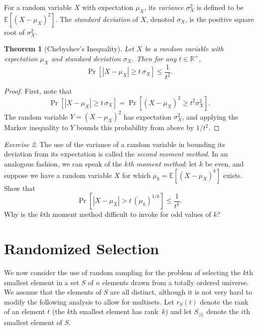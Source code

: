 \documentclass[twoside,12pt]{book}
\theoremstyle{plain}
\newtheorem{theorem}{Theorem}[chapter]
\theoremstyle{definition}
\theoremstyle{remark}
\newtheorem{exercise}[theorem]{Exercise}
\begin{document}
For a random variable $X$ with expectation $\mu_X$, its \emph{variance} $\sigma_X^2$ is defined to be $\mathbb{E}[(X - \mu_X)^2]$. The \emph{standard deviation} of $X$, denoted $\sigma_X$, is the positive square root of $\sigma_X^2$.

\begin{theorem}[Chebyshev's Inequality]
\label{thm:chebyshev}
Let $X$ be a random variable with expectation $\mu_X$ and standard deviation $\sigma_X$. Then for any $t \in \mathbb{R}^+$,
\[
\Pr[|X - \mu_X| \geq t\,\sigma_X] \leq \frac{1}{t^2}.
\]
\end{theorem}

\begin{proof}
First, note that
\[
\Pr[|X - \mu_X| \geq t\,\sigma_X] = \Pr[(X - \mu_X)^2 \geq t^2 \sigma_X^2].
\]
The random variable $Y = (X - \mu_X)^2$ has expectation $\sigma_X^2$, and applying the Markov inequality to $Y$ bounds this probability from above by $1/t^2$.
\end{proof}

\begin{exercise}
The use of the variance of a random variable in bounding its deviation from its expectation is called the \emph{second moment method}. In an analogous fashion, we can speak of the \emph{$k$th moment method}: let $k$ be even, and suppose we have a random variable $X$ for which $\mu_k = \mathbb{E}[(X - \mu_X)^k]$ exists. Show that
\[
\Pr[|X - \mu_X| > t\,(\mu_k)^{1/k}] \leq \frac{1}{t^k}.
\]
Why is the $k$th moment method difficult to invoke for odd values of $k$?
\end{exercise}

\section{Randomized Selection}
\label{sec:rand-sel}

We now consider the use of random sampling for the problem of selecting the $k$th smallest element in a set $S$ of $n$ elements drawn from a totally ordered universe. We assume that the elements of $S$ are all distinct, although it is not very hard to modify the following analysis to allow for multisets. Let $r_S(t)$ denote the rank of an element $t$ (the $k$th smallest element has rank~$k$) and let $S_{\langle i \rangle}$ denote the $i$th smallest element of $S$.
\end{document}
